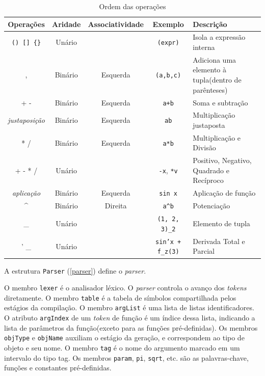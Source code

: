 \begin{table}[ht]
\caption{Ordem das operações}
\label{order}
\begin{centering}
\begin{tabularx}{\textwidth}{||c|c|c|c|X||}
    \cline{1-5}
    Operações & Aridade & Associatividade & Exemplo & Descrição \\ \hline \hline

    \texttt{() [] \{\}} & Unário &  & \texttt{(expr)} & Isola a expressão interna \\ \hline

    , & Binário & Esquerda & \texttt{(a,b,c)} & Adiciona uma elemento à tupla(dentro de parênteses) \\ \hline

    + - & Binário & Esquerda & \texttt{a+b} & Soma e subtração \\ \hline

    \textit{justaposição} & Binário & Esquerda & \texttt{ab} & Multiplicação justaposta \\ \hline

    * / & Binário & Esquerda & \texttt{a*b} & Multiplicação e Divisão \\ \hline

    + - * / & Unário &  & \texttt{-x}, \texttt{*v} & Positivo, Negativo, Quadrado e Recíproco \\ \hline

    \textit{aplicação} & Binário & Esquerda & \texttt{sin x} & Aplicação de função \\ \hline

    \textasciicircum & Binário & Direita & \texttt{a\textasciicircum b} & Potenciação \\ \hline

    \_ & Unário & & \texttt{(1, 2, 3)\_2} & Elemento de tupla \\ \hline
    
    ' \_ & Unário & & \texttt{sin'x + f\_z(3)} & Derivada Total e Parcial \\ \hline
    \cline{1-5}
\end{tabularx}
\end{centering}
\end{table}

\newpage
A estrutura \texttt{Parser} (\ref{parser}) define o \textit{parser}.

\lstset{language=c++}

O membro \texttt{lexer} é o analisador léxico.
O \textit{parser} controla o avanço dos \textit{\textit{token}s} diretamente.
O membro \texttt{table} é a tabela de símbolos compartilhada
pelos estágios da compilação.
O membro \texttt{argList} é uma lista de listas identificadores.
O atributo \texttt{argIndex} de um \textit{token} de função é um índice dessa lista,
indicando a lista de parâmetros da função(exceto para as funções pré-definidas).
Os membros \texttt{objType} e \texttt{objName} auxiliam o estágio da geração,
e correspondem ao tipo de objeto e seu nome.
O membro \texttt{tag} é o nome do argumento marcado em um intervalo do tipo tag.
Os membros \texttt{param}, \texttt{pi}, \texttt{sqrt}, etc. são
as palavras-chave, funções e constantes pré-definidas.

